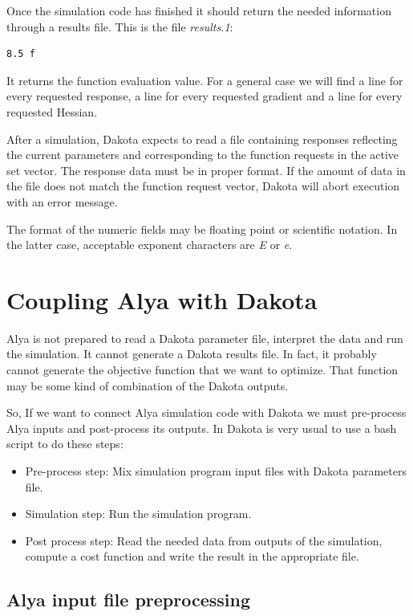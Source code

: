 \documentclass[12pt,a4paper,article]{memoir}
\begin{document}
Once the simulation code has finished it should return the needed information through a results file. This is the file \textit{results.1}: 

\begin{lstlisting}[style=MyCodeStyle,language=bash]
      8.5 f   
\end{lstlisting}

It returns the function evaluation value. For a general case we will find a line for every requested response, a line for every requested gradient and a line for every requested Hessian.

After a simulation, Dakota expects to read a file containing responses reflecting the current parameters and corresponding to the function requests in the active set vector. The response data must be in proper format. If the amount of data in the file does not match the function request vector, Dakota will abort execution with an error message.

The format of the numeric fields may be floating point or scientific notation. In the latter case, acceptable exponent characters are \textit{E} or \textit{e}.

\chapter{Coupling Alya with Dakota}

Alya is not prepared to read a Dakota parameter file, interpret the data and run the simulation. It cannot generate a Dakota results file. In fact, it probably cannot generate the objective function that we want to optimize. That function may be some kind of combination of the Dakota outputs.

So, If we want to connect Alya simulation code with Dakota we must pre-process Alya inputs and post-process its outputs. In Dakota is very usual to use a bash script to do these steps:

\begin{itemize}
\item Pre-process step: Mix simulation program input files with Dakota parameters file.
\item Simulation step: Run the simulation program.
\item Post process step: Read the needed data from outputs of the simulation, compute a cost function and write the result in the appropriate file.
\end{itemize}

\section{Alya input file preprocessing}
\end{document}
